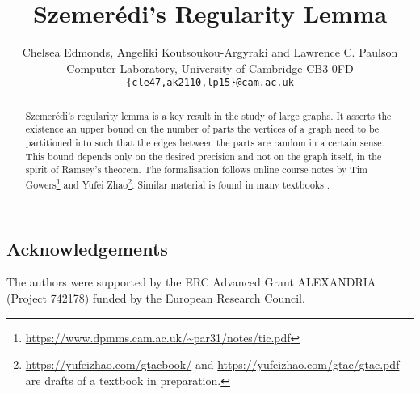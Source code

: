 \documentclass[11pt,a4paper]{article}
\begin{document}
\title{Szemerédi's Regularity Lemma}
\author{Chelsea Edmonds, Angeliki Koutsoukou-Argyraki and Lawrence C. Paulson\\
Computer Laboratory, University of Cambridge CB3 0FD\\
\texttt{\{cle47,ak2110,lp15\}@cam.ac.uk}}

\maketitle

\begin{abstract}
Szemerédi's regularity lemma \cite{szemeredi-regular} is a key result in the study of large graphs. It asserts the existence an upper bound on the number of parts the vertices of a graph need to be partitioned into such that the edges between the parts are random in a certain sense. This bound depends only on the desired precision and not on the graph itself, in the spirit of Ramsey's theorem. The formalisation follows online course notes by Tim Gowers\footnote{\url{https://www.dpmms.cam.ac.uk/~par31/notes/tic.pdf}} 
and Yufei Zhao\footnote{\url{https://yufeizhao.com/gtacbook/} and \url{https://yufeizhao.com/gtac/gtac.pdf} are drafts of a textbook in preparation.}. 
Similar material is found in many textbooks \cite{diestel-graph}.
\end{abstract}

\tableofcontents

\subsection*{Acknowledgements}
The authors were supported by the ERC Advanced Grant ALEXANDRIA (Project 742178) funded by the European Research Council. 



\newpage


\end{document}
